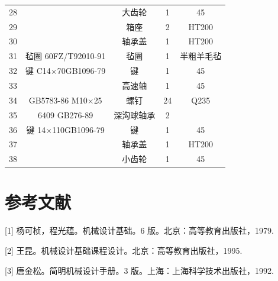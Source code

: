 \documentclass[12pt]{ctexart}
\begin{document}
\begin{center}
\begin{longtable}{ccccc}
    28 &                          & 大齿轮    & 1 & 45\\
    29 &                          & 箱座      & 2 & HT200\\
    30 &                          & 轴承盖    & 1 & HT200\\
    31 & 毡圈 60FZ/T92010-91      & 毡圈      & 1 & 半粗羊毛毡\\
    32 & 键 C14$\times$70GB1096-79& 键        & 1 & 45\\
    33 &                          & 高速轴        & 1 & 45\\  
    34 & GB5783-86 M10$\times$25  & 螺钉      & 24 & Q235\\
    35 & 6409 GB276-89            & 深沟球轴承& 2 & \\
    36 & 键 14$\times$110GB1096-79 & 键  & 1 & 45\\
    37 &                          & 轴承盖 & 1 & HT200\\
    38 &                          & 小齿轮 & 1 & 45\\

\end{longtable}
\end{center}
\newpage
\section{参考文献}

[1] 杨可桢，程光蕴。机械设计基础。6 版。北京：高等教育出版社，1979.

[2] 王昆。机械设计基础课程设计。北京：高等教育出版社，1995.

[3] 唐金松。简明机械设计手册。3 版。上海：上海科学技术出版社，1992.
\end{document}
